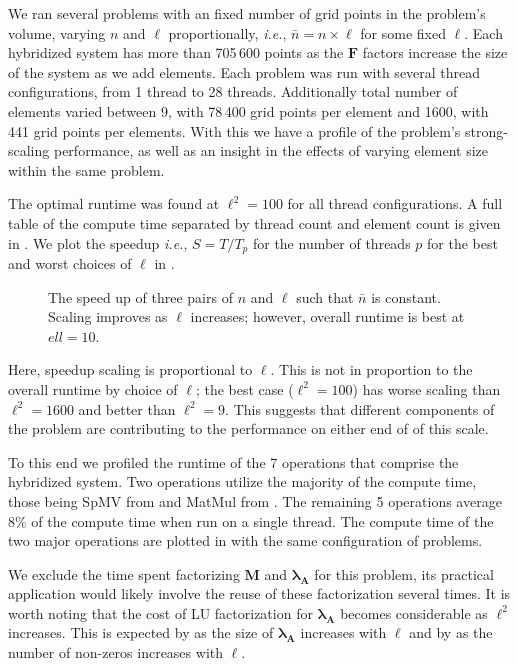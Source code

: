 %
%
%
We ran several problems with an fixed number of grid points in the problem's volume, varying $n$ and $\ell$ proportionally, \emph{i.e.}, $\bar{n} = n \times \ell$ for some fixed $\ell$.
Each hybridized system has more than 705\,600 points as the $\textbf{F}$  factors increase the size of the system as we add elements.
Each problem was run with several thread configurations, from 1 thread to 28 threads. 
Additionally total number of elements varied between 9, with 78\,400 grid points per element and 1600, with 441 grid points per elements. 
With this we have a profile of the problem's strong-scaling performance, as well as an insight in the effects of varying element size within the same problem.  

%
%
%
The optimal runtime was found at $\ell^2 = 100$ for all thread configurations. 
A full table of the compute time separated by thread count and element count is given in .
We plot the speedup \emph{i.e.}, $S = T/T_{p}$ for the number of threads $p$ for the best and worst choices of $\ell$ in .

%
%
%
\begin{figure}[!hb]
	
	\caption{
	    The speed up of three pairs of $n$ and $\ell$ such that $\bar{n}$ is constant. 
	    Scaling improves as $\ell$ increases; however, overall runtime is best at $ell = 10$. 
	    }
    \label{fig:sca_exp_a}
\end{figure}

Here, speedup scaling is proportional to $\ell$. 
This is not in proportion to the overall runtime by choice of $\ell$; the best case ($\ell^2 = 100$) has worse scaling than $\ell^2 = 1600$ and better than $\ell^2 = 9$.
This suggests that different components of the problem are contributing to the performance on either end of of this scale. 

%
%
%
To this end we profiled the runtime of the 7 operations that comprise the hybridized system. 
Two operations utilize the majority of the compute time, those being SpMV from  and MatMul from .
The remaining 5 operations average $8\%$ of the compute time when run on a single thread. 
The compute time of the two major operations are plotted in  with the same configuration of problems. 

%
%
%


%
%
%
We exclude the time spent factorizing $\textbf{M}$ and $\symbf{\lambda}_{\textbf{A}}$ for this problem, its practical application would likely involve the reuse of these factorization several times. 
It is worth noting that the cost of LU factorization for $\symbf{\lambda}_{\textbf{A}}$ becomes considerable as $\ell^2$ increases. 
This is expected by  as the size of $\symbf{\lambda}_{\textbf{A}}$ increases with $\ell$ and by  as the number of non-zeros increases with $\ell$.

